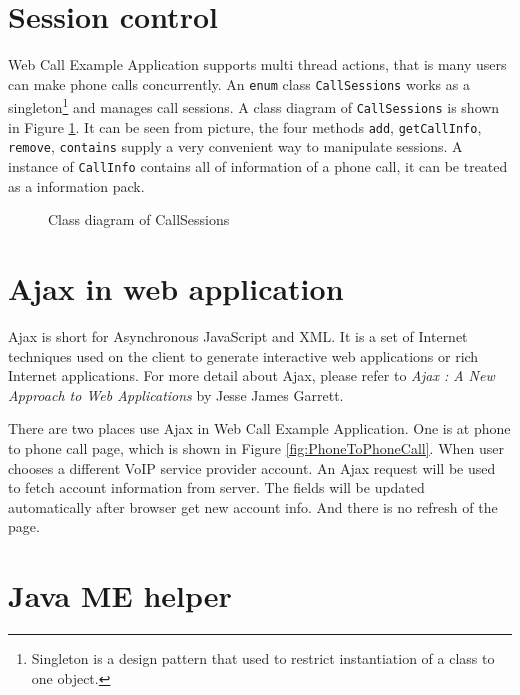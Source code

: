 \section{Session control}
\label{sec:WebApplication:SessionControl}

Web Call Example Application supports multi thread actions, that is many users can make phone calls concurrently. An \texttt{enum} class \texttt{CallSessions} works as a singleton\footnote{Singleton is a design pattern that used to restrict instantiation of a class to one object.} and manages call sessions. A class diagram of \texttt{CallSessions} is shown in Figure \ref{fig:ClassDiagramOfCallSessions}. It can be seen from picture, the four methods \texttt{add}, \texttt{getCallInfo}, \texttt{remove}, \texttt{contains} supply a very convenient way to manipulate sessions. A instance of \texttt{CallInfo} contains all of information of a phone call, it can be treated as a information pack.

\begin{figure}[!hbtp]
\centering
{}
\caption{Class diagram of CallSessions}
\label{fig:ClassDiagramOfCallSessions}
\end{figure} 

\section{Ajax in web application}
\label{sec:WebApplication:AjaxInWebApplication}

Ajax\label{sym:Ajax} is short for Asynchronous JavaScript and XML. It is a set of Internet techniques used on the client to generate interactive web applications or rich Internet applications. For more detail about Ajax, please refer to \textit{Ajax : A New Approach to Web Applications} by Jesse James Garrett\cite{Ajax}.

There are two places use Ajax in Web Call Example Application. One is at phone to phone call page, which is shown in Figure \ref{fig:PhoneToPhoneCall}. When user chooses a different VoIP service provider account. An Ajax request will be used to fetch account information from server. The fields will be updated automatically after browser get new account info. And there is no refresh of the page. 

\section{Java ME helper}
\label{sec:WebApplication:JavaMEHelper}

